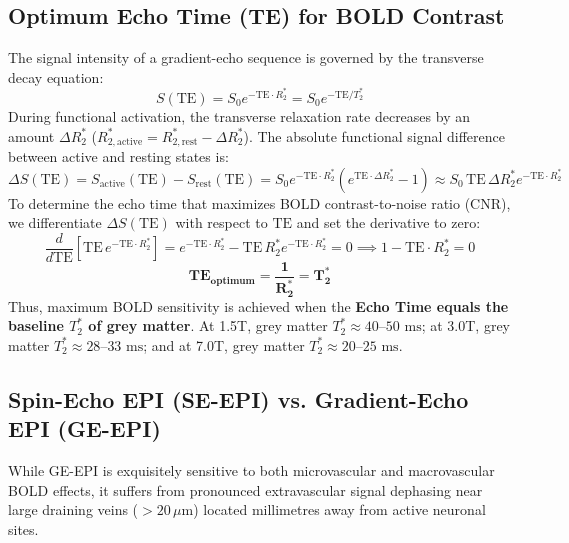 \documentclass[11pt,a4paper]{article}
\begin{document}
\subsection{Optimum Echo Time (TE) for BOLD Contrast}
The signal intensity of a gradient-echo sequence is governed by the transverse decay equation:
\begin{equation}
    S(\text{TE}) = S_0 e^{-\text{TE} \cdot R_2^*} = S_0 e^{-\text{TE} / T_2^*}
\end{equation}
During functional activation, the transverse relaxation rate decreases by an amount $\Delta R_2^*$ ($R_{2,\text{active}}^* = R_{2,\text{rest}}^* - \Delta R_2^*$). The absolute functional signal difference between active and resting states is:
\begin{equation}
    \Delta S(\text{TE}) = S_{\text{active}}(\text{TE}) - S_{\text{rest}}(\text{TE}) = S_0 e^{-\text{TE} \cdot R_2^*} \left( e^{\text{TE} \cdot \Delta R_2^*} - 1 \right) \approx S_0 \, \text{TE} \, \Delta R_2^* e^{-\text{TE} \cdot R_2^*}
\end{equation}
To determine the echo time that maximizes BOLD contrast-to-noise ratio ($\text{CNR}$), we differentiate $\Delta S(\text{TE})$ with respect to $\text{TE}$ and set the derivative to zero:
\begin{equation}
    \frac{d}{d\text{TE}} \left[ \text{TE} \, e^{-\text{TE} \cdot R_2^*} \right] = e^{-\text{TE} \cdot R_2^*} - \text{TE} \, R_2^* e^{-\text{TE} \cdot R_2^*} = 0 \implies 1 - \text{TE} \cdot R_2^* = 0
\end{equation}
\begin{equation}
    \mathbf{\text{TE}_{\text{optimum}} = \frac{1}{R_2^*} = T_2^*}
\end{equation}
Thus, maximum BOLD sensitivity is achieved when the \textbf{Echo Time equals the baseline $T_2^*$ of grey matter}. At 1.5T, grey matter $T_2^* \approx 40\text{--}50\text{ ms}$; at 3.0T, grey matter $T_2^* \approx 28\text{--}33\text{ ms}$; and at 7.0T, grey matter $T_2^* \approx 20\text{--}25\text{ ms}$.

\subsection{Spin-Echo EPI (SE-EPI) vs. Gradient-Echo EPI (GE-EPI)}
While GE-EPI is exquisitely sensitive to both microvascular and macrovascular BOLD effects, it suffers from pronounced extravascular signal dephasing near large draining veins ($> 20\,\mu\text{m}$) located millimetres away from active neuronal sites. 
\end{document}
